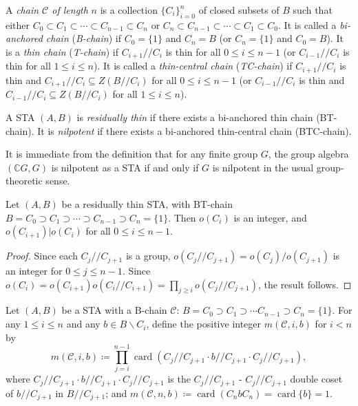 \documentclass[ALCO,ThmDefs,Unicode,epreuves]{cedram}
\DeclareMathOperator{\card}{card}
\newcommand{\C}{{\mathbb C}}
\begin{document}
\begin{defi}
\label{def:chain}
A \emph{chain $\mathcal{C}$ of length} $n$ is a collection $\{C_i\}_{i=0}^n$
of closed subsets of $B$ such that either $C_0 \subset C_1 \subset
\cdots \subset C_{n-1} \subset C_n$ or $C_n \subset C_{n-1} \subset
\cdots \subset C_1 \subset C_0$. 
 It is called a \emph{bi-anchored chain}
(\emph{B-chain}) if $C_0 = \{1\}$ and $C_n = B$ (or $C_n = \{1\}$ and
$C_0 = B$). It is a \emph{thin chain} (\emph{T-chain}) if $C_{i+1}//C_i$
is thin for all $0 \leq i \leq n-1$ (or $C_{i-1}//C_i$ is thin for all
$1 \leq i \leq n$). It is called a \emph{thin-central chain}
(\emph{TC-chain}) if $C_{i+1}//C_i$ is thin and $C_{i+1}//C_i \subseteq
Z(B//C_i)$ for all $0 \leq i \leq n-1$ (or $C_{i-1}//C_i$ is thin and
$C_{i-1}//C_i \subseteq Z(B//C_i)$ for all $1 \leq i \leq n$).
\end{defi}

\begin{defi}
\label{def:res_thin_nilp}
A STA $(A, B)$ is \emph{residually thin} if there exists a bi-anchored
thin chain (BT-chain). It is \emph{nilpotent} if there exists a
bi-anchored thin-central chain (BTC-chain).
\end{defi}

\begin{rema}
\label{rem:nilp_group}
It is immediate from the definition that for any finite group $G$, the
group algebra $({\C}G, G)$ is nilpotent as a STA if and only if $G$ is
nilpotent in the usual group-theoretic sense.
\end{rema}

\begin{prop}
\label{prop:res_thin_order}
Let $(A, B)$ be a residually thin STA, with BT-chain $B = C_0 \supset
C_1 \supset \cdots \supset C_{n-1} \supset C_n = \{1\}$. Then $o(C_i)$
is an integer, and $o(C_{i+1}) \vert o(C_i)$ for all $0 \leq i \leq
n-1$.
\end{prop}

\begin{proof}
Since each $C_j//C_{j+1}$ is a group, $o(C_j//C_{j+1}) =
o(C_j)/o(C_{j+1})$ is an integer for $0 \leq j \leq n-1$. Since $o(C_i)
= o(C_{i+1})o(C_i//C_{i+1}) = \prod_{j \geq i}o(C_j//C_{j+1})$, the
result follows.
\end{proof}

\begin{defi}
\label{def:card_number}
Let $(A, B)$ be a STA with a B-chain $\mathcal{C}$: $B = C_0 \supset C_1
\supset \cdots C_{n-1} \supset C_n = \{1\}$. For any $1 \leq i \leq n$
and any $b \in
B\backslash C_i$, define the positive integer $m(\mathcal{C}, i,
b)$ for $i < n$ by 
\[
m(\mathcal{C}, i, b) \coloneqq \prod_{j=i}^{n-1}\card (C_j//C_{j+1}
\cdot b//C_{j+1} \cdot C_j//C_{j+1}),
\]
where $C_j//C_{j+1} \cdot b//C_{j+1} \cdot C_j//C_{j+1}$ is the
$C_j//C_{j+1}$ - $C_j//C_{j+1}$ double coset of $b//C_{j+1}$ in
$B//C_{j+1}$; and $m(\mathcal{C}, n, b) \coloneqq \card (C_nbC_n) = \card\{b\} = 1$.
\end{defi}
 
\end{document}
